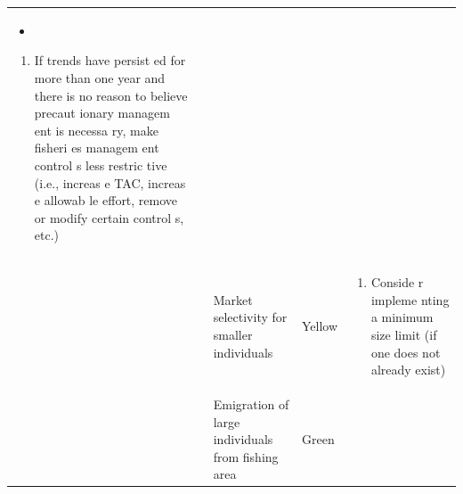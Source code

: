 \documentclass[]{book}
\providecommand{\tightlist}{%
  \setlength{\itemsep}{0pt}\setlength{\parskip}{0pt}}
\begin{document}
\begin{longtable}[]{@{}lllll@{}}
\begin{minipage}[t]{0.19\columnwidth}
\begin{itemize}
\item
\end{itemize}

\begin{enumerate}
\def\labelenumi{\arabic{enumi}.}
\setcounter{enumi}{1}
\tightlist
\item
  If trends have persist ed for more than one year and there is no
  reason to believe precaut ionary managem ent is necessa ry, make
  fisheri es managem ent control s less restric tive (i.e., increas e
  TAC, increas e allowab le effort, remove or modify certain control s,
  etc.)
\end{enumerate}\strut
\end{minipage}\tabularnewline
\begin{minipage}[t]{0.19\columnwidth}\raggedright\strut
\strut
\end{minipage} & \begin{minipage}[t]{0.19\columnwidth}\raggedright\strut
\strut
\end{minipage} & \begin{minipage}[t]{0.19\columnwidth}\raggedright\strut
Market selectivity for smaller individuals\strut
\end{minipage} & \begin{minipage}[t]{0.19\columnwidth}\raggedright\strut
Yellow\strut
\end{minipage} & \begin{minipage}[t]{0.19\columnwidth}\raggedright\strut
\begin{enumerate}
\def\labelenumi{\arabic{enumi}.}
\tightlist
\item
  Conside r impleme nting a minimum size limit (if one does not already
  exist)
\end{enumerate}\strut
\end{minipage}\tabularnewline
\begin{minipage}[t]{0.19\columnwidth}\raggedright\strut
\strut
\end{minipage} & \begin{minipage}[t]{0.19\columnwidth}\raggedright\strut
\strut
\end{minipage} & \begin{minipage}[t]{0.19\columnwidth}\raggedright\strut
Emigration of large individuals from fishing area\strut
\end{minipage} & \begin{minipage}[t]{0.19\columnwidth}\raggedright\strut
Green\strut
\end{minipage} & \begin{minipage}[t]{0.19\columnwidth}\raggedright\strut

\end{minipage}
\end{longtable}
\end{document}
